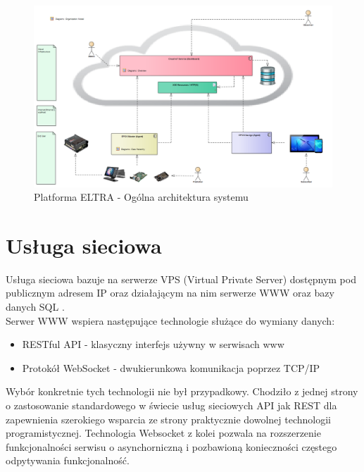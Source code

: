 \documentclass[a4paper,10pt]{article}
\begin{document}
\begin{figure}[H]
\begin{center}
\includegraphics[width=1.0\textwidth]{eltra.png}
\end{center}
\caption{Platforma ELTRA - Ogólna architektura systemu}
\label{rysunek_architektura_systemu}
\end{figure}

\section{Usługa sieciowa}
\label{usluga_sieciowa}

Usługa sieciowa bazuje na serwerze VPS (Virtual Private Server)\cite{VPSWiki} dostępnym pod publicznym adresem IP oraz działającym na nim serwerze WWW \cite{WWWWiki} oraz bazy danych SQL \cite{MySQLWiki}.\\

Serwer WWW wspiera następujące technologie służące do wymiany danych:

\begin{itemize}
    \item RESTful API - klasyczny interfejs używny w serwisach www \cite{RestApiWiki}
    \item Protokół WebSocket \cite{WebsocketWiki} - dwukierunkowa komunikacja poprzez TCP/IP
\end{itemize}

Wybór konkretnie tych technologii nie był przypadkowy. Chodziło z jednej strony o zastosowanie standardowego w świecie usług sieciowych API jak REST dla zapewnienia szerokiego wsparcia ze strony praktycznie dowolnej technologii programistycznej. Technologia Websocket \cite{WebsocketWiki} z kolei pozwala na rozszerzenie funkcjonalności serwisu o asynchorniczną i pozbawioną konieczności częstego odpytywania funkcjonalność.
\end{document}
